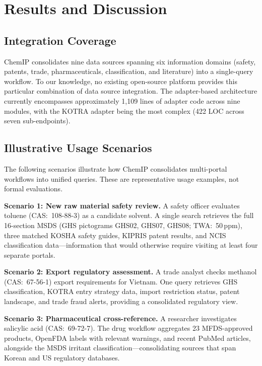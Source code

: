 \documentclass[10pt]{article}
\begin{document}
\section{Results and Discussion}
\label{sec:results}

\subsection{Integration Coverage}

ChemIP consolidates nine data sources spanning six information domains (safety, patents, trade, pharmaceuticals, classification, and literature) into a single-query workflow.
To our knowledge, no existing open-source platform provides this particular combination of data source integration.
The adapter-based architecture currently encompasses approximately 1,109 lines of adapter code across nine modules, with the KOTRA adapter being the most complex (422 LOC across seven sub-endpoints).

\subsection{Illustrative Usage Scenarios}

The following scenarios illustrate how ChemIP consolidates multi-portal workflows into unified queries.
These are representative usage examples, not formal evaluations.

\textbf{Scenario 1: New raw material safety review.}
A safety officer evaluates toluene (CAS:~108-88-3) as a candidate solvent.
A single search retrieves the full 16-section MSDS (GHS pictograms GHS02, GHS07, GHS08; TWA:~50\,ppm), three matched KOSHA safety guides, KIPRIS patent results, and NCIS classification data---information that would otherwise require visiting at least four separate portals.

\textbf{Scenario 2: Export regulatory assessment.}
A trade analyst checks methanol (CAS:~67-56-1) export requirements for Vietnam.
One query retrieves GHS classification, KOTRA entry strategy data, import restriction status, patent landscape, and trade fraud alerts, providing a consolidated regulatory view.

\textbf{Scenario 3: Pharmaceutical cross-reference.}
A researcher investigates salicylic acid (CAS:~69-72-7).
The drug workflow aggregates 23 MFDS-approved products, OpenFDA labels with relevant warnings, and recent PubMed articles, alongside the MSDS irritant classification---consolidating sources that span Korean and US regulatory databases.
\end{document}
